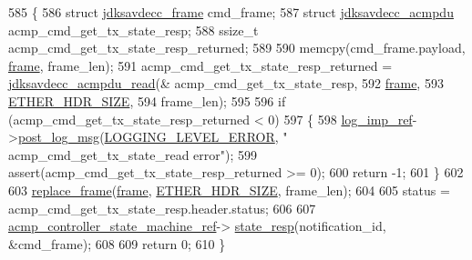 \begin{DoxyCode}
585 \{
586     \textcolor{keyword}{struct }\hyperlink{structjdksavdecc__frame}{jdksavdecc\_frame} cmd\_frame;
587     \textcolor{keyword}{struct }\hyperlink{structjdksavdecc__acmpdu}{jdksavdecc\_acmpdu} acmp\_cmd\_get\_tx\_state\_resp;
588     ssize\_t acmp\_cmd\_get\_tx\_state\_resp\_returned;
589 
590     memcpy(cmd\_frame.payload, \hyperlink{gst__avb__playbin_8c_ac8e710e0b5e994c0545d75d69868c6f0}{frame}, frame\_len);
591     acmp\_cmd\_get\_tx\_state\_resp\_returned = \hyperlink{group__acmpdu_gaf49dbf727e31865dd891330cbdeeabc2}{jdksavdecc\_acmpdu\_read}(&
      acmp\_cmd\_get\_tx\_state\_resp,
592                                                                  \hyperlink{gst__avb__playbin_8c_ac8e710e0b5e994c0545d75d69868c6f0}{frame},
593                                                                  \hyperlink{namespaceavdecc__lib_a6c827b1a0d973e18119c5e3da518e65ca9512ad9b34302ba7048d88197e0a2dc0}{ETHER\_HDR\_SIZE},
594                                                                  frame\_len);
595 
596     \textcolor{keywordflow}{if} (acmp\_cmd\_get\_tx\_state\_resp\_returned < 0)
597     \{
598         \hyperlink{namespaceavdecc__lib_acbe3e2a96ae6524943ca532c87a28529}{log\_imp\_ref}->\hyperlink{classavdecc__lib_1_1log_a68139a6297697e4ccebf36ccfd02e44a}{post\_log\_msg}(\hyperlink{namespaceavdecc__lib_a501055c431e6872ef46f252ad13f85cdaf2c4481208273451a6f5c7bb9770ec8a}{LOGGING\_LEVEL\_ERROR}, \textcolor{stringliteral}{"
      acmp\_cmd\_get\_tx\_state\_read error"});
599         assert(acmp\_cmd\_get\_tx\_state\_resp\_returned >= 0);
600         \textcolor{keywordflow}{return} -1;
601     \}
602 
603     \hyperlink{classavdecc__lib_1_1descriptor__base__imp_a482fe95208e9e14885e28e73e7be2c49}{replace\_frame}(\hyperlink{gst__avb__playbin_8c_ac8e710e0b5e994c0545d75d69868c6f0}{frame}, \hyperlink{namespaceavdecc__lib_a6c827b1a0d973e18119c5e3da518e65ca9512ad9b34302ba7048d88197e0a2dc0}{ETHER\_HDR\_SIZE}, frame\_len);
604 
605     status = acmp\_cmd\_get\_tx\_state\_resp.header.status;
606 
607     \hyperlink{namespaceavdecc__lib_a693c2049de1d4ec860a92126b846ac21}{acmp\_controller\_state\_machine\_ref}->
      \hyperlink{classavdecc__lib_1_1acmp__controller__state__machine_affdd2e72c0e7a518e4b8993e23750aa9}{state\_resp}(notification\_id, &cmd\_frame);
608 
609     \textcolor{keywordflow}{return} 0;
610 \}
\end{DoxyCode}



